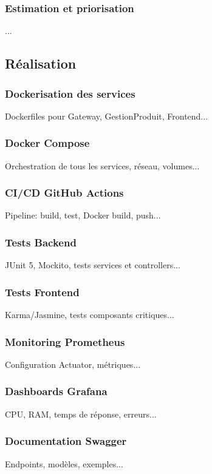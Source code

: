 \documentclass[12pt,a4paper]{report}
\begin{document}
\subsubsection{Estimation et priorisation}
...

\subsection{Réalisation}
\subsubsection{Dockerisation des services}
Dockerfiles pour Gateway, GestionProduit, Frontend...

\subsubsection{Docker Compose}
Orchestration de tous les services, réseau, volumes...

\subsubsection{CI/CD GitHub Actions}
Pipeline: build, test, Docker build, push...

\subsubsection{Tests Backend}
JUnit 5, Mockito, tests services et controllers...

\subsubsection{Tests Frontend}
Karma/Jasmine, tests composants critiques...

\subsubsection{Monitoring Prometheus}
Configuration Actuator, métriques...

\subsubsection{Dashboards Grafana}
CPU, RAM, temps de réponse, erreurs...

\subsubsection{Documentation Swagger}
Endpoints, modèles, exemples...
\end{document}
